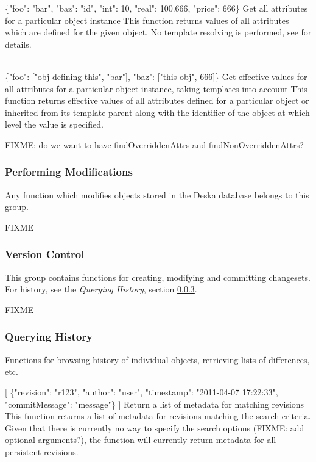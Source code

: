 \documentclass{article}
\begin{document}
    {\{"foo": "bar", "baz": "id", "int": 10, "real": 100.666, "price": 666\}}
    {Get all attributes for a particular object instance}
    {This function returns values of all attributes which are defined for the given object.  No template resolving is
    performed, see  for details.}

    {\\ \{"foo": ["obj-defining-this", "bar"], "baz": ["this-obj", 666]\}}
    {Get effective values for all attributes for a particular object instance, taking templates into account}
    {This function returns effective values of all attributes defined for a particular object or inherited from its
    template parent along with the identifier of the object at which level the value is specified.}

FIXME: do we want to have findOverriddenAttrs and findNonOverriddenAttrs?

\subsubsection{Performing Modifications}
\label{sec:api-group-data-modification}

Any function which modifies objects stored in the Deska database belongs to this group.

FIXME

\subsubsection{Version Control}
\label{sec:api-group-vcs}

This group contains functions for creating, modifying and committing changesets.  For history, see the {\em Querying
History}, section \ref{sec:api-group-history}.

FIXME

\subsubsection{Querying History}
\label{sec:api-group-history}

Functions for browsing history of individual objects, retrieving lists of differences, etc.

    {[
    \{"revision": "r123", "author": "user", "timestamp": "2011-04-07 17:22:33", "commitMessage": "message"\}
    ]}
    {Return a list of metadata for matching revisions}
    {This function returns a list of metadata for revisions matching the search criteria.  Given that there is currently
    no way to specify the search options (FIXME: add optional arguments?), the function will currently return metadata
    for all persistent revisions.}
\end{document}
